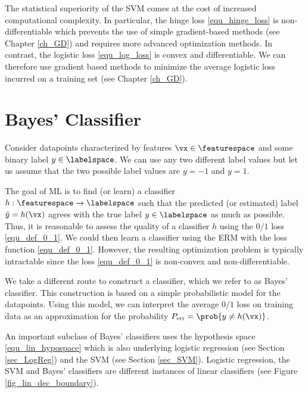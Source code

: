 \documentclass[12pt]{report}
\begin{document}
The statistical superiority of the SVM comes at the cost of increased 
computational complexity. In particular, the hinge loss \eqref{equ_hinge_loss} 
is non-differentiable which prevents the use of  simple gradient-based 
methods (see Chapter \ref{ch_GD}) and requires more advanced optimization 
methods. In contrast, the logistic loss \eqref{equ_log_loss} is convex and 
differentiable. We can therefore use gradient based methods to minimize 
the average logistic loss incurred on a training set (see Chapter \ref{ch_GD}). 


\section{Bayes' Classifier}
\label{sec_NaiveBayes}

Consider datapoints characterized by features $\vx \in \featurespace$ 
and some binary label $y \in \labelspace$. We can use any two different 
label values but let us assume that the two possible label values 
are $y=-1$ and $y=1$. 


The goal of ML is to find (or learn) a classifier $h: \featurespace \rightarrow \labelspace$ 
such that the predicted (or estimated) label $\hat{y} = h(\vx)$ agrees 
with the true label $y \in \labelspace$ as much as possible. Thus, it 
is reasonable to assess the quality of a classifier $h$ using the $0/1$ 
loss \eqref{equ_def_0_1}. We could then learn a classifier using the ERM 
with the loss function \eqref{equ_def_0_1}. However, the resulting 
optimization problem is typically intractable since the loss \eqref{equ_def_0_1} 
is non-convex and non-differentiable. 

We take a different route to construct a classifier, which we refer to 
as Bayes' classifier. This construction is based on a simple probabilistic 
model for the datapoints. Using this model, we can interpret the average 
$0/1$ loss on training data as an approximation for the probability 
$P_{\rm err} = \prob{ y \neq h(\vx) }$. 


An important subclass of Bayes' classifiers uses the hypothesis 
space \eqref{equ_lin_hypospace} which is also underlying logistic 
regression (see Section \ref{sec_LogReg}) and the SVM (see Section 
\ref{sec_SVM}). Logistic regression, the SVM and Bayes' 
classifiers are different instances of linear classifiers (see Figure \ref{fig_lin_dec_boundary}). 
\end{document}

